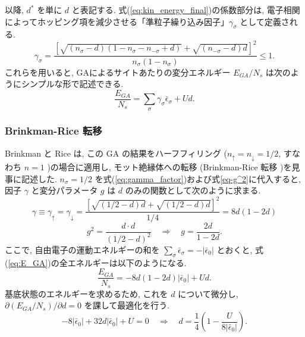 以降, $d^*$ を単に $d$ と表記する. 
式(\ref{eq:kin_energy_final})の係数部分は, 電子相関によってホッピング項を減少させる「準粒子繰り込み因子」$\gamma_\sigma$ として定義される.
\begin{equation}
    \gamma_\sigma = \frac{\left[ \sqrt{(n_\sigma - d)(1 - n_\sigma - n_{-\sigma} + d)} + \sqrt{(n_{-\sigma} - d)d} \right]^2}{n_\sigma(1 - n_\sigma)} \le 1 .
    \label{eq:gamma_factor}
\end{equation}
これらを用いると, GAによるサイトあたりの変分エネルギー $E_{GA} / N_s$ は次のようにシンプルな形で記述できる.
\begin{equation}
    \frac{E_{GA}}{N_s} = \sum_\sigma \gamma_\sigma \bar{\epsilon}_\sigma + U d .
    \label{eq:E_GA}
\end{equation}

\subsubsection{Brinkman-Rice 転移}
Brinkman と Rice は, この GA の結果をハーフフィリング ($n_\uparrow = n_\downarrow = 1/2$, すなわち $n = 1$ )の場合に適用し, モット絶縁体への転移 (Brinkman-Rice 転移 )を見事に記述した. 
$n_\sigma = 1/2$ を式(\ref{eq:gamma_factor})および式\ref{eq-g^2}に代入すると, 因子 $\gamma$ と変分パラメータ $g$ は $d$ のみの関数として次のように求まる.
\begin{equation}
    \gamma \equiv \gamma_\uparrow = \gamma_\downarrow = \frac{\left[ \sqrt{(1/2 - d)d} + \sqrt{(1/2 - d)d} \right]^2}{1/4} = 8d(1 - 2d)
    \label{eq:gamma_half}
\end{equation}
\begin{equation}
    g^2 = \frac{d \cdot d}{(1/2 - d)^2} \quad \Rightarrow \quad g = \frac{2d}{1 - 2d} .
    \label{eq:g_half}
\end{equation}
ここで, 自由電子の運動エネルギーの和を $\sum_\sigma \bar{\epsilon}_\sigma = -|\bar{\epsilon}_0|$ とおくと, 式(\ref{eq:E_GA})の全エネルギーは以下のようになる.
\begin{equation}
    \frac{E_{GA}}{N_s} = -8d(1 - 2d)|\bar{\epsilon}_0| + Ud .
    \label{eq:E_GA_half}
\end{equation}
基底状態のエネルギーを求めるため, これを $d$ について微分し, $\partial (E_{GA}/N_s)/ \partial d = 0$ を課して最適化を行う.
\begin{equation}
    -8|\bar{\epsilon}_0| + 32d|\bar{\epsilon}_0| + U = 0 \quad \Rightarrow \quad d = \frac{1}{4} \left( 1 - \frac{U}{8|\bar{\epsilon}_0|} \right).
    \label{eq:d_optimization}
\end{equation}
